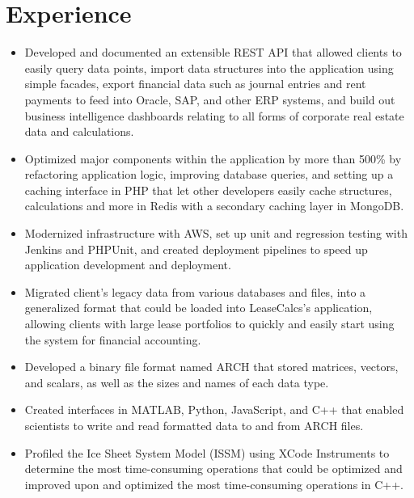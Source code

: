\documentclass[letterpaper]{styles} %
\begin{document}
\begin{minipage}[t]{0.65\textwidth} %

\vspace{-10mm}


\section{Experience}


\begin{itemize}[leftmargin=.5cm]
\item Developed and documented an extensible REST API that allowed clients to easily query data points, import data structures into the application using simple facades, export financial data such as journal entries and rent payments to feed into Oracle, SAP, and other ERP systems, and build out business intelligence dashboards relating to all forms of corporate real estate data and calculations.
\item Optimized major components within the application by more than 500\% by refactoring application logic, improving database queries, and setting up a caching interface in PHP that let other developers easily cache structures, calculations and more in Redis with a secondary caching layer in MongoDB.
\item Modernized infrastructure with AWS, set up unit and regression testing with Jenkins and PHPUnit, and created deployment pipelines to speed up application development and deployment.
\item Migrated client's legacy data from various databases and files, into a generalized format that could be loaded into LeaseCalcs's application, allowing clients with large lease portfolios to quickly and easily start using the system for financial accounting.
\end{itemize}


\begin{itemize}[leftmargin=.5cm]
\item Developed a binary file format named ARCH that stored matrices, vectors, and scalars, as well as the sizes and
names of each data type.
\item Created interfaces in MATLAB, Python, JavaScript, and C++ that enabled scientists to write and read formatted
data to and from ARCH files.
\item Profiled the Ice Sheet System Model (ISSM) using XCode Instruments to determine the most time-consuming operations that could be optimized and improved upon and optimized the most time-consuming operations in C++.
\end{itemize}



\end{minipage}
\end{document}
